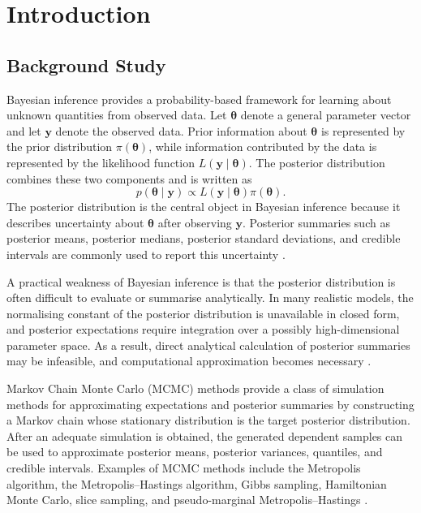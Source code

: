 \chapter{Introduction}

\section{Background Study}

Bayesian inference provides a probability-based framework for learning about unknown quantities from observed data. Let $\boldsymbol{\theta}$ denote a general parameter vector and let $\mathbf{y}$ denote the observed data. Prior information about $\boldsymbol{\theta}$ is represented by the prior distribution $\pi(\boldsymbol{\theta})$, while information contributed by the data is represented by the likelihood function $L(\mathbf{y}\mid \boldsymbol{\theta})$. The posterior distribution combines these two components and is written as
\[
p(\boldsymbol{\theta}\mid \mathbf{y})
\propto
L(\mathbf{y}\mid \boldsymbol{\theta})\pi(\boldsymbol{\theta}).
\]
The posterior distribution is the central object in Bayesian inference because it describes uncertainty about $\boldsymbol{\theta}$ after observing $\mathbf{y}$. Posterior summaries such as posterior means, posterior medians, posterior standard deviations, and credible intervals are commonly used to report this uncertainty \cite{gelman2013bayesian}.

A practical weakness of Bayesian inference is that the posterior distribution is often difficult to evaluate or summarise analytically. In many realistic models, the normalising constant of the posterior distribution is unavailable in closed form, and posterior expectations require integration over a possibly high-dimensional parameter space. As a result, direct analytical calculation of posterior summaries may be infeasible, and computational approximation becomes necessary \cite{gelman2013bayesian,tierney1994markov}.

Markov Chain Monte Carlo (MCMC) methods provide a class of simulation methods for approximating expectations and posterior summaries by constructing a Markov chain whose stationary distribution is the target posterior distribution. After an adequate simulation is obtained, the generated dependent samples can be used to approximate posterior means, posterior variances, quantiles, and credible intervals. Examples of MCMC methods include the Metropolis algorithm, the Metropolis--Hastings algorithm, Gibbs sampling, Hamiltonian Monte Carlo, slice sampling, and pseudo-marginal Metropolis--Hastings \cite{metropolis1953equation,hastings1970monte,tierney1994markov}.

